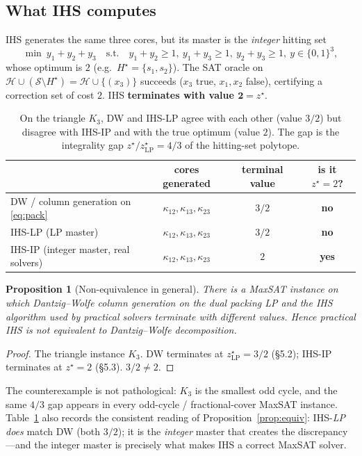 \documentclass[11pt,a4paper]{article}
\newtheorem{proposition}{Proposition}
\begin{document}
\subsection{What IHS computes}

IHS generates the same three cores, but its master is the \emph{integer} hitting
set
\[
\min\ y_1+y_2+y_3 \quad\text{s.t.}\quad y_1+y_2\ge1,\ y_1+y_3\ge1,\ y_2+y_3\ge1,\ y\in\{0,1\}^3,
\]
whose optimum is $2$ (e.g.\ $H^\star=\{s_1,s_2\}$). The SAT oracle on
$\mathcal{H}\cup(\mathcal{S}\setminus H^\star)=\mathcal{H}\cup\{(x_3)\}$ succeeds
($x_3$ true, $x_1,x_2$ false), certifying a correction set of cost $2$. IHS
\textbf{terminates with value $\boldsymbol{2} = z^\star$}.

\begin{table}[h]
\centering
\small
\begin{tabular}{l c c c}
\toprule
& cores generated & terminal value & is it $z^\star=2$? \\
\midrule
DW / column generation on \eqref{eq:pack} & $\kappa_{12},\kappa_{13},\kappa_{23}$ & $3/2$ & \textbf{no} \\
IHS-LP (LP master) & $\kappa_{12},\kappa_{13},\kappa_{23}$ & $3/2$ & \textbf{no} \\
IHS-IP (integer master, real solvers) & $\kappa_{12},\kappa_{13},\kappa_{23}$ & $2$ & \textbf{yes} \\
\bottomrule
\end{tabular}
\caption{On the triangle $K_3$, DW and IHS-LP agree with each other (value
$3/2$) but disagree with IHS-IP and with the true optimum (value $2$). The gap
is the integrality gap $z^\star/z^\star_{\mathrm{LP}} = 4/3$ of the hitting-set
polytope.}
\label{tab:counter}
\end{table}

\begin{proposition}[Non-equivalence in general]
\label{prop:nonequiv}
There is a MaxSAT instance on which Dantzig--Wolfe column generation on the dual
packing LP and the IHS algorithm used by practical solvers terminate with
different values. Hence practical IHS is \emph{not} equivalent to Dantzig--Wolfe
decomposition.
\end{proposition}

\begin{proof}
The triangle instance $K_3$. DW terminates at $z^\star_{\mathrm{LP}} = 3/2$
(\S5.2); IHS-IP terminates at $z^\star = 2$ (\S5.3). $3/2 \ne 2$.
\end{proof}

The counterexample is not pathological: $K_3$ is the smallest odd cycle, and the
same $4/3$ gap appears in every odd-cycle / fractional-cover MaxSAT instance.
Table~\ref{tab:counter} also records the consistent reading of
Proposition~\ref{prop:equiv}: IHS-\emph{LP} \emph{does} match DW (both $3/2$);
it is the \emph{integer} master that creates the discrepancy---and the integer
master is precisely what makes IHS a correct MaxSAT solver.
\end{document}
